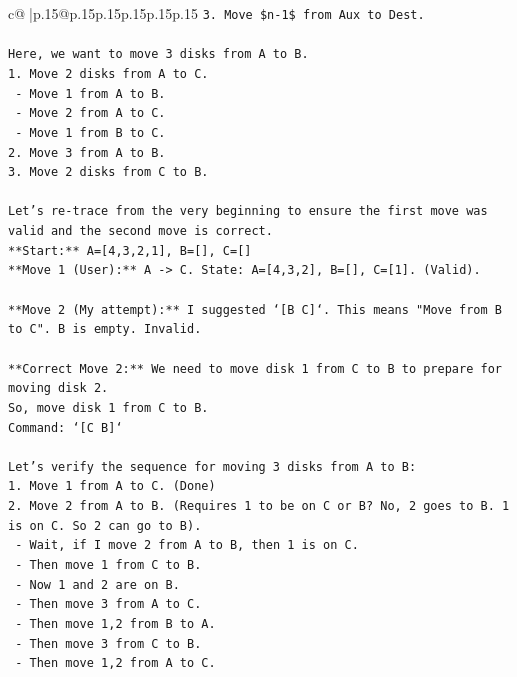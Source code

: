 \documentclass{article}
\begin{document}
{\begin{supertabular}{c@{$\;$}|p{.15\linewidth}@{}p{.15\linewidth}p{.15\linewidth}p{.15\linewidth}p{.15\linewidth}p{.15\linewidth}}
{{{\texttt{3. Move \$n{-}1\$ from Aux to Dest.} \\
\\ 
\texttt{Here, we want to move 3 disks from A to B.} \\
\texttt{1. Move 2 disks from A to C.} \\
\texttt{   {-} Move 1 from A to B.} \\
\texttt{   {-} Move 2 from A to C.} \\
\texttt{   {-} Move 1 from B to C.} \\
\texttt{2. Move 3 from A to B.} \\
\texttt{3. Move 2 disks from C to B.} \\
\\ 
\texttt{Let's re{-}trace from the very beginning to ensure the first move was valid and the second move is correct.} \\
\texttt{**Start:** A={[}4,3,2,1{]}, B={[}{]}, C={[}{]}} \\
\texttt{**Move 1 (User):** A {-}> C. State: A={[}4,3,2{]}, B={[}{]}, C={[}1{]}. (Valid).} \\
\\ 
\texttt{**Move 2 (My attempt):** I suggested `{[}B C{]}`. This means "Move from B to C". B is empty. Invalid.} \\
\\ 
\texttt{**Correct Move 2:** We need to move disk 1 from C to B to prepare for moving disk 2.} \\
\texttt{So, move disk 1 from C to B.} \\
\texttt{Command: `{[}C B{]}`} \\
\\ 
\texttt{Let's verify the sequence for moving 3 disks from A to B:} \\
\texttt{1. Move 1 from A to C. (Done)} \\
\texttt{2. Move 2 from A to B. (Requires 1 to be on C or B? No, 2 goes to B. 1 is on C. So 2 can go to B).} \\
\texttt{   {-} Wait, if I move 2 from A to B, then 1 is on C.} \\
\texttt{   {-} Then move 1 from C to B.} \\
\texttt{   {-} Now 1 and 2 are on B.} \\
\texttt{   {-} Then move 3 from A to C.} \\
\texttt{   {-} Then move 1,2 from B to A.} \\
\texttt{   {-} Then move 3 from C to B.} \\
\texttt{   {-} Then move 1,2 from A to C.} \\
}}}
\end{supertabular}}
\end{document}
